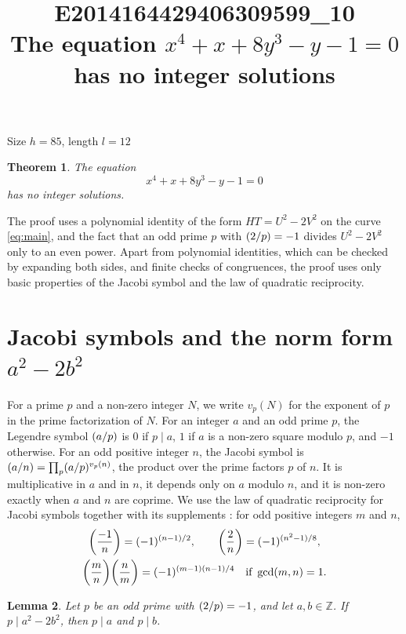 \documentclass[11pt]{article}
\title{\textbf{E2014164429406309599\_10}\\[4pt] {\Large The equation $x^{4}+x+8y^{3}-y-1=0$ has no integer solutions}}
\author{}
\date{}
\newtheorem{theorem}{Theorem}
\newtheorem{lemma}[theorem]{Lemma}
\newcommand{\Z}{\mathbb{Z}}
\newcommand{\leg}[2]{\mathchoice{\biggl(\dfrac{#1}{#2}\biggr)}{(#1/#2)}{(#1/#2)}{(#1/#2)}}
\begin{document}
\maketitle
\vspace{-8ex}
\begin{center}
Size $h=85$, length $l=12$
\end{center}

\begin{theorem}\label{thm:main}
The equation
\begin{equation}\label{eq:main}
x^{4}+x+8y^{3}-y-1=0
\end{equation}
has no integer solutions.
\end{theorem}

The proof uses a polynomial identity of the form $HT=U^2-2V^2$ on the curve \eqref{eq:main}, and the fact that an odd prime $p$ with $\leg{2}{p}=-1$ divides $U^2-2V^2$ only to an even power. Apart from polynomial identities, which can be checked by expanding both sides, and finite checks of congruences, the proof uses only basic properties of the Jacobi symbol and the law of quadratic reciprocity.

\section{\texorpdfstring{Jacobi symbols and the norm form $a^2-2b^2$}{Jacobi symbols and the norm form}}

For a prime $p$ and a non-zero integer $N$, we write $v_p(N)$ for the exponent of $p$ in the prime factorization of $N$. For an integer $a$ and an odd prime $p$, the Legendre symbol $\leg{a}{p}$ is $0$ if $p\mid a$, $1$ if $a$ is a non-zero square modulo $p$, and $-1$ otherwise. For an odd positive integer $n$, the Jacobi symbol is $\leg{a}{n}=\prod_p\leg{a}{p}^{v_p(n)}$, the product over the prime factors $p$ of $n$. It is multiplicative in $a$ and in $n$, it depends only on $a$ modulo $n$, and it is non-zero exactly when $a$ and $n$ are coprime. We use the law of quadratic reciprocity for Jacobi symbols together with its supplements \cite[Chapter~5, \S2]{IR}: for odd positive integers $m$ and $n$,
\begin{gather*}
\leg{-1}{n}=(-1)^{(n-1)/2},\qquad\leg{2}{n}=(-1)^{(n^2-1)/8},\\
\leg{m}{n}\leg{n}{m}=(-1)^{(m-1)(n-1)/4}\quad\text{if }\gcd(m,n)=1.
\end{gather*}

\begin{lemma}\label{lem:divides}
Let $p$ be an odd prime with $\leg{2}{p}=-1$, and let $a,b\in\Z$. If $p\mid a^2-2b^2$, then $p\mid a$ and $p\mid b$.
\end{lemma}
\end{document}
